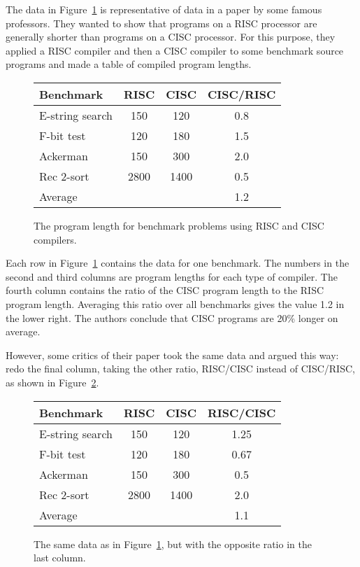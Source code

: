 The data in Figure~\ref{fig:17P4} is representative of data in a paper
by some famous professors.  They wanted to show that programs on a
RISC processor are generally shorter than programs on a CISC
processor.  For this purpose, they applied a RISC compiler and then a
CISC compiler to some benchmark source programs and made a table of
compiled program lengths.

\begin{figure}

\begin{tabular}{lccc}
Benchmark        & RISC          & CISC          & CISC/RISC\\
\hline
E-string search  & 150           & 120           & 0.8 \\
F-bit test       & 120           & 180           & 1.5 \\
Ackerman         & 150           & 300           & 2.0 \\
Rec 2-sort       & 2800          & 1400          & 0.5 \\
\hline
Average          &               &               & 1.2
\end{tabular}

\caption{The program length for benchmark problems using RISC and CISC
compilers.}

\label{fig:17P4}

\end{figure}

Each row in Figure~\ref{fig:17P4} contains the data for one benchmark.
The numbers in the second and third columns are program lengths for
each type of compiler.  The fourth column contains the ratio of the
CISC program length to the RISC program length.  Averaging this ratio
over all benchmarks gives the value 1.2 in the lower right.  The
authors conclude that CISC programs are 20\% longer on average.

However, some critics of their paper took the same data and argued this
way: redo the final column, taking the other ratio, RISC/CISC instead of
CISC/RISC, as shown in Figure~\ref{fig:17P5}.

\begin{figure}

\begin{tabular}{lccc}
Benchmark        & RISC          & CISC          & RISC/CISC\\
\hline
E-string search  & 150           & 120           & 1.25 \\
F-bit test       & 120           & 180           & 0.67 \\
Ackerman         & 150           & 300           & 0.5 \\
Rec 2-sort       & 2800          & 1400          & 2.0 \\
\hline
Average          &               &               & 1.1
\end{tabular}

\caption{The same data as in Figure~\ref{fig:17P4}, but with the
  opposite ratio in the last column.}

\label{fig:17P5}

\end{figure}

